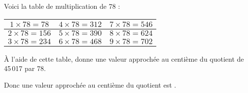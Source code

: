 Voici la table de multiplication de 78 :
\begin{center}
\begin{tabular}{|c|c|c|}
\hline
$1\times78=78$&$4\times78=312$&$7\times78=546$\\
\hline
$2\times78=156$&$5\times78=390$&$8\times78=624$\\
\hline
$3\times78=234$&$6\times78=468$&$9\times78=702$\\
\hline
\end{tabular}
\end{center}
\par \`A l'aide de cette table, donne une valeur approchée au centième
du quotient de 45\,017 par 78.
\par Donc une valeur approchée au centième du quotient est .
